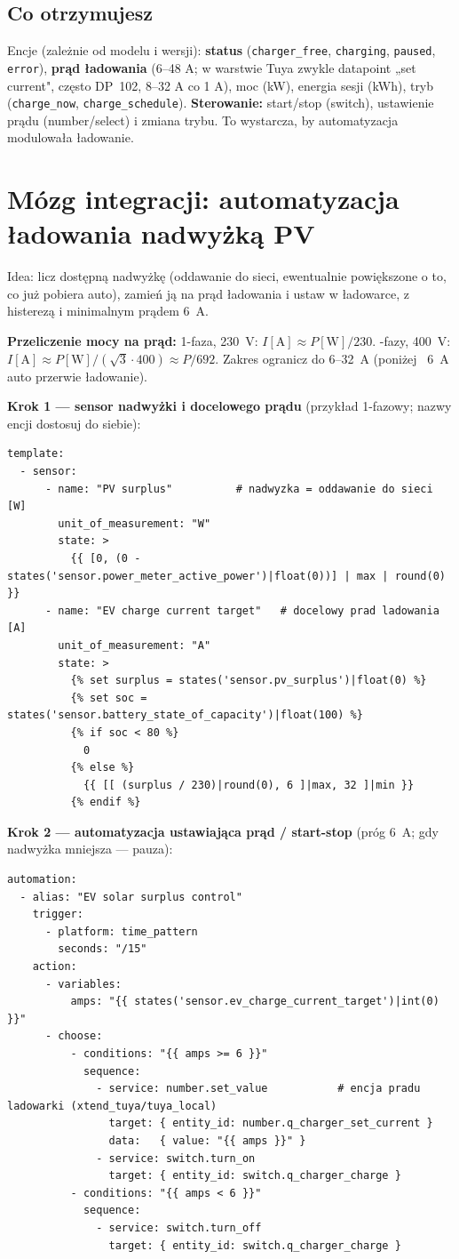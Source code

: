 \documentclass[11pt]{article}
\newcommand{\key}[1]{\textbf{\color{navy}#1}}
\begin{document}
\subsection{Co otrzymujesz}
Encje (zależnie od modelu i wersji): \key{status} (\verb|charger_free|, \verb|charging|, \verb|paused|, \verb|error|), \key{prąd ładowania} (6–48 A; w warstwie Tuya zwykle datapoint „set current", często DP~102, 8–32 A co 1 A), moc (kW), energia sesji (kWh), tryb (\verb|charge_now|, \verb|charge_schedule|). \key{Sterowanie:} start/stop (switch), ustawienie prądu (number/select) i zmiana trybu. To wystarcza, by automatyzacja modulowała ładowanie.

\section{Mózg integracji: automatyzacja ładowania nadwyżką PV}
Idea: licz dostępną nadwyżkę (oddawanie do sieci, ewentualnie powiększone o to, co już pobiera auto), zamień ją na prąd ładowania i ustaw w ładowarce, z histerezą i minimalnym prądem 6~A.

\key{Przeliczenie mocy na prąd:} 1-faza, 230~V: $I[\mathrm{A}] \approx P[\mathrm{W}]/230$. -fazy, 400~V: $I[\mathrm{A}] \approx P[\mathrm{W}]/(\sqrt{3}\cdot 400) \approx P/692$. Zakres ogranicz do 6–32~A (poniżej ~6~A auto przerwie ładowanie).

\key{Krok 1 — sensor nadwyżki i docelowego prądu} (przykład 1-fazowy; nazwy encji dostosuj do siebie):
\begin{lstlisting}
template:
  - sensor:
      - name: "PV surplus"          # nadwyzka = oddawanie do sieci [W]
        unit_of_measurement: "W"
        state: >
          {{ [0, (0 - states('sensor.power_meter_active_power')|float(0))] | max | round(0) }}
      - name: "EV charge current target"   # docelowy prad ladowania [A]
        unit_of_measurement: "A"
        state: >
          {% set surplus = states('sensor.pv_surplus')|float(0) %}
          {% set soc = states('sensor.battery_state_of_capacity')|float(100) %}
          {% if soc < 80 %}
            0
          {% else %}
            {{ [[ (surplus / 230)|round(0), 6 ]|max, 32 ]|min }}
          {% endif %}
\end{lstlisting}

\key{Krok 2 — automatyzacja ustawiająca prąd / start-stop} (próg 6~A; gdy nadwyżka mniejsza — pauza):
\begin{lstlisting}
automation:
  - alias: "EV solar surplus control"
    trigger:
      - platform: time_pattern
        seconds: "/15"
    action:
      - variables:
          amps: "{{ states('sensor.ev_charge_current_target')|int(0) }}"
      - choose:
          - conditions: "{{ amps >= 6 }}"
            sequence:
              - service: number.set_value           # encja pradu ladowarki (xtend_tuya/tuya_local)
                target: { entity_id: number.q_charger_set_current }
                data:   { value: "{{ amps }}" }
              - service: switch.turn_on
                target: { entity_id: switch.q_charger_charge }
          - conditions: "{{ amps < 6 }}"
            sequence:
              - service: switch.turn_off
                target: { entity_id: switch.q_charger_charge }
\end{lstlisting}
\end{document}
